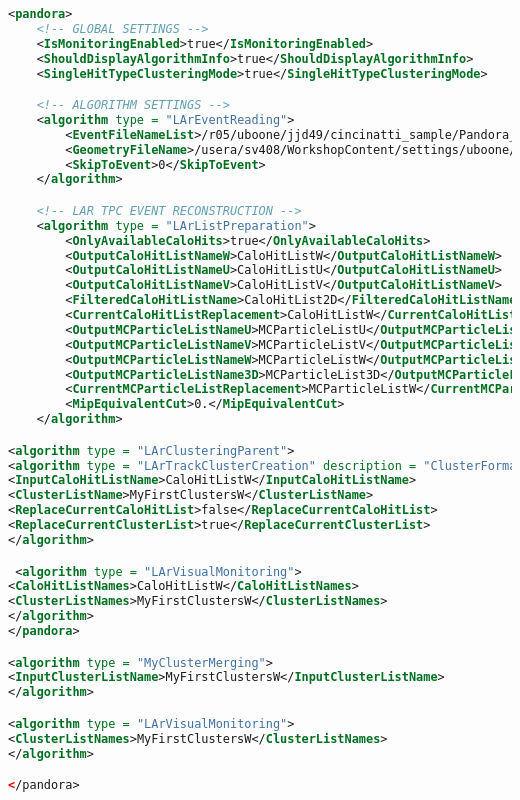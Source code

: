 \begin{lstlisting}[language=XML, caption=New version of PandoraSettings${\_}$Workshop.xml]
<pandora>
    <!-- GLOBAL SETTINGS -->
    <IsMonitoringEnabled>true</IsMonitoringEnabled>
    <ShouldDisplayAlgorithmInfo>true</ShouldDisplayAlgorithmInfo>
    <SingleHitTypeClusteringMode>true</SingleHitTypeClusteringMode>

    <!-- ALGORITHM SETTINGS -->
    <algorithm type = "LArEventReading">
        <EventFileNameList>/r05/uboone/jjd49/cincinatti_sample/Pandora_Events_Cincinatti_BNB_NuMu_1714.pndr</EventFileNameList>
        <GeometryFileName>/usera/sv408/WorkshopContent/settings/uboone/Geometry_MicroBooNE.xml</GeometryFileName>
        <SkipToEvent>0</SkipToEvent>
    </algorithm>

    <!-- LAR TPC EVENT RECONSTRUCTION -->
    <algorithm type = "LArListPreparation">
        <OnlyAvailableCaloHits>true</OnlyAvailableCaloHits>
        <OutputCaloHitListNameW>CaloHitListW</OutputCaloHitListNameW>
        <OutputCaloHitListNameU>CaloHitListU</OutputCaloHitListNameU>
        <OutputCaloHitListNameV>CaloHitListV</OutputCaloHitListNameV>
        <FilteredCaloHitListName>CaloHitList2D</FilteredCaloHitListName>
        <CurrentCaloHitListReplacement>CaloHitListW</CurrentCaloHitListReplacement>
        <OutputMCParticleListNameU>MCParticleListU</OutputMCParticleListNameU>
        <OutputMCParticleListNameV>MCParticleListV</OutputMCParticleListNameV>
        <OutputMCParticleListNameW>MCParticleListW</OutputMCParticleListNameW>
        <OutputMCParticleListName3D>MCParticleList3D</OutputMCParticleListName3D>
        <CurrentMCParticleListReplacement>MCParticleListW</CurrentMCParticleListReplacement>
        <MipEquivalentCut>0.</MipEquivalentCut>
    </algorithm>

<algorithm type = "LArClusteringParent">
<algorithm type = "LArTrackClusterCreation" description = "ClusterFormation"/>
<InputCaloHitListName>CaloHitListW</InputCaloHitListName>
<ClusterListName>MyFirstClustersW</ClusterListName>
<ReplaceCurrentCaloHitList>false</ReplaceCurrentCaloHitList>
<ReplaceCurrentClusterList>true</ReplaceCurrentClusterList>
</algorithm>

 <algorithm type = "LArVisualMonitoring">
<CaloHitListNames>CaloHitListW</CaloHitListNames>
<ClusterListNames>MyFirstClustersW</ClusterListNames>
</algorithm>
</pandora>

<algorithm type = "MyClusterMerging">
<InputClusterListName>MyFirstClustersW</InputClusterListName>
</algorithm>

<algorithm type = "LArVisualMonitoring"> 
<ClusterListNames>MyFirstClustersW</ClusterListNames> 
</algorithm> 

</pandora>

\end{lstlisting}

